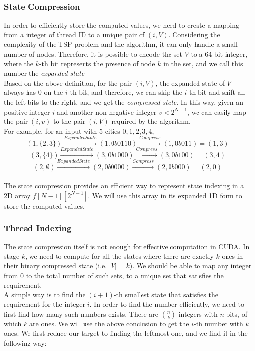 \documentclass{article}
\begin{document}
\subsubsection{State Compression}
   In order to efficiently store the computed values, we need to create a mapping from a integer of thread ID to a unique pair of $(i, V)$. Considering the complexity of the TSP problem and the algorithm, it can only handle a small number of nodes. Therefore, it is possible to encode the set $V$ to a 64-bit integer, where the $k$-th bit represents the presence of node $k$ in the set, and we call this number the \textit{expanded state}.\\
    
    Based on the above definition, for the pair $(i, V)$, the expanded state of $V$ always has 0 on the $i$-th bit, and therefore, we can skip the $i$-th bit and shift all the left bits to the right, and we get the \textit{compressed state}. In this way, given an positive integer $i$ and another non-negative integer $v < 2^{N-1}$, we can easily map the pair $(i, v)$ to the pair $(i, V)$ required by the algorithm.\\
    
    For example, for an input with 5 cities $0, 1, 2, 3, 4$,
    $$(1, \{2, 3\}) \xrightarrow{Expanded State} (1, 0b0110) \xrightarrow{Compress} (1, 0b011) = (1, 3)$$
    $$(3, \{4\}) \xrightarrow{Expanded State} (3, 0b1000) \xrightarrow{Compress} (3, 0b100) = (3, 4)$$
    $$(2, \emptyset) \xrightarrow{Expanded State} (2, 0b0000) \xrightarrow{Compress} (2, 0b000) = (2, 0)$$\\
    
    The state compression provides an efficient way to represent state indexing in a 2D array $f[N-1][2^{N-1}]$. We will use this array in its expanded 1D form to store the computed values.
\subsubsection{Thread Indexing}
    The state compression itself is not enough for effective computation in CUDA. In stage $k$, we need to compute for all the states where there are exactly $k$ ones in their binary compressed state (i.e. $|V| = k$). We should be able to map any integer from 0 to the total number of such sets, to a unique set that satisfies the requirement.\\
    
    A simple way is to find the $(i+1)$-th smallest state that satisfies the requirement for the integer $i$. In order to find the number efficiently, we need to first find how many such numbers exists. There are ${n\choose k}$ integers with $n$ bits, of which $k$ are ones. We will use the above conclusion to get the $i$-th number with $k$ ones. We first reduce our target to finding the leftmost one, and we find it in the following way:\\
    
\end{document}
